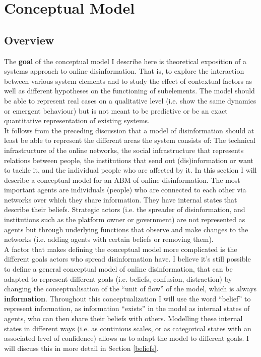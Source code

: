\documentclass[10pt,a4paper]{article}
\begin{document}
\section{Conceptual Model}

\subsection{Overview}
The \textbf{goal} of the conceptual model I describe here is theoretical exposition \citep{Edmonds2017} of a systems approach to online disinformation. That is, to explore the interaction between various system elements and to study the effect of contextual factors as well as different hypotheses on the functioning of subelements. The model should be able to represent real cases on a qualitative level (i.e. show the same dynamics or emergent behaviour) but is not meant to be predictive or be an exact quantitative representation of existing systems. \\

It follows from the preceding discussion that a model of disinformation should at least be able to represent the different areas the system consists of: The technical infrastructure of the online networks, the social infrastructure that represents relations between people, the institutions that send out (dis)information or want to tackle it, and the individual people who are affected by it. In this section I will describe a conceptual model for an ABM of online disinformation. The most important agents are individuals (people) who are connected to each other via networks over which they share information. They have internal states that describe their beliefs. Strategic actors (i.e. the spreader of disinformation, and institutions such as the platform owner or government) are not represented as agents but through underlying functions that observe and make changes to the networks (i.e. adding agents with certain beliefs or removing them).  \\

A factor that makes defining the conceptual model more complicated is the different goals actors who spread disinformation have. I believe it's still possible to define a general conceptual model of online disinformation, that can be adapted to represent different goals (i.e. beliefs, confusion, distraction) by changing the conceptualisation of the ``unit of flow'' of the model, which is always \textbf{information}. Throughout this conceptualization I will use the word ``belief'' to represent information, as information ``exists'' in the model as internal states of agents, who can then share their beliefs with others. Modelling these internal states in different ways (i.e. as continious scales, or as categorical states with an associated level of confidence) allows us to adapt the model to different goals. I will discuss this in more detail in Section \ref{beliefs}. \\
\end{document}
